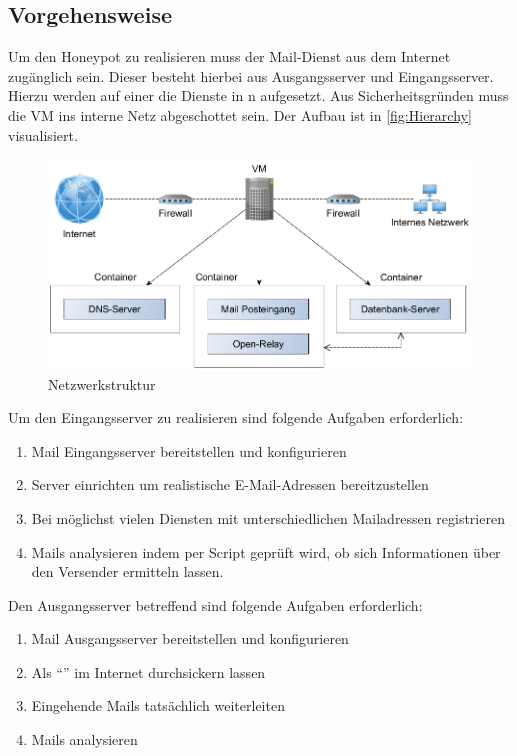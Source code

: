 \documentclass[a4paper,11pt,singlespacing]{article}
\begin{document}
	\subsection{Vorgehensweise}\label{sec:EinleitungVorgehensweise}
		Um den Honeypot zu realisieren muss der Mail-Dienst aus dem Internet zugänglich sein.
		Dieser besteht hierbei aus Ausgangsserver und Eingangsserver.
		Hierzu werden auf einer  die Dienste in n aufgesetzt.
		Aus Sicherheitsgründen muss die VM ins interne Netz abgeschottet sein.
		Der Aufbau ist in \autoref{fig:Hierarchy} visualisiert.

		\begin{figure}[H]
		\includegraphics[width=\linewidth]{2-Hierarchy.png}
		\caption{Netzwerkstruktur}
		\label{fig:Hierarchy}
		\end{figure}

		Um den Eingangsserver zu realisieren sind folgende Aufgaben erforderlich:
		\begin{enumerate}
		\item Mail Eingangsserver bereitstellen und konfigurieren
		\item {} Server einrichten um realistische E-Mail-Adressen bereitzustellen
		\item Bei möglichst vielen Diensten mit unterschiedlichen Mailadressen registrieren
		\item Mails analysieren indem per Script geprüft wird, ob sich Informationen  über den Versender ermitteln lassen.
		\end{enumerate}

		Den Ausgangsserver betreffend sind folgende Aufgaben erforderlich:
		\begin{enumerate}
		\item Mail Ausgangsserver bereitstellen und konfigurieren
		\item Als "`"' im Internet durchsickern lassen
		\item Eingehende Mails tatsächlich weiterleiten
		\item Mails analysieren
		\end{enumerate}
\end{document}
